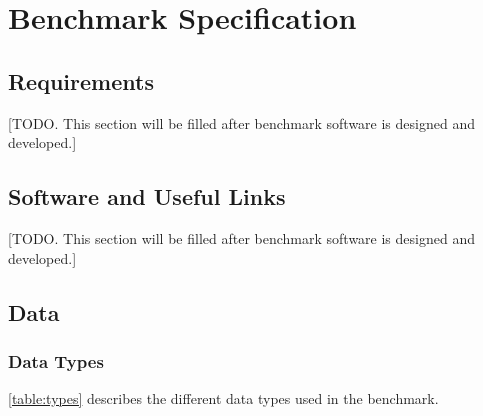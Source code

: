 \chapter{Benchmark Specification}
\label{section:benchmark-specification}

\section{Requirements}

[TODO. This section will be filled after benchmark software is designed and
developed.]


\section{Software and Useful Links}

[TODO. This section will be filled after benchmark software is designed and
developed.]


\section{Data}

\subsection{Data Types}

\autoref{table:types} describes the different data types used in the benchmark.


